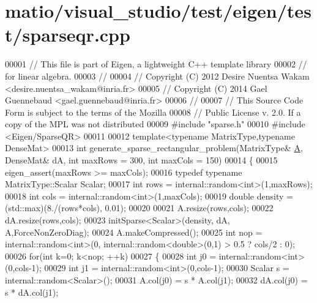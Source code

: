 \hypertarget{matio_2visual__studio_2test_2eigen_2test_2sparseqr_8cpp_source}{}\section{matio/visual\+\_\+studio/test/eigen/test/sparseqr.cpp}
\label{matio_2visual__studio_2test_2eigen_2test_2sparseqr_8cpp_source}

\begin{DoxyCode}
00001 \textcolor{comment}{// This file is part of Eigen, a lightweight C++ template library}
00002 \textcolor{comment}{// for linear algebra.}
00003 \textcolor{comment}{//}
00004 \textcolor{comment}{// Copyright (C) 2012 Desire Nuentsa Wakam <desire.nuentsa\_wakam@inria.fr>}
00005 \textcolor{comment}{// Copyright (C) 2014 Gael Guennebaud <gael.guennebaud@inria.fr>}
00006 \textcolor{comment}{//}
00007 \textcolor{comment}{// This Source Code Form is subject to the terms of the Mozilla}
00008 \textcolor{comment}{// Public License v. 2.0. If a copy of the MPL was not distributed}
00009 \textcolor{preprocessor}{#include "sparse.h"}
00010 \textcolor{preprocessor}{#include <Eigen/SparseQR>}
00011 
00012 \textcolor{keyword}{template}<\textcolor{keyword}{typename} MatrixType,\textcolor{keyword}{typename} DenseMat>
00013 \textcolor{keywordtype}{int} generate\_sparse\_rectangular\_problem(MatrixType& \hyperlink{group___core___module_class_eigen_1_1_matrix}{A}, DenseMat& dA, \textcolor{keywordtype}{int} maxRows = 300, \textcolor{keywordtype}{int} maxCols = 150)
00014 \{
00015   eigen\_assert(maxRows >= maxCols);
00016   \textcolor{keyword}{typedef} \textcolor{keyword}{typename} MatrixType::Scalar Scalar;
00017   \textcolor{keywordtype}{int} rows = internal::random<int>(1,maxRows);
00018   \textcolor{keywordtype}{int} cols = internal::random<int>(1,maxCols);
00019   \textcolor{keywordtype}{double} density = (std::max)(8./(rows*cols), 0.01);
00020   
00021   A.resize(rows,cols);
00022   dA.resize(rows,cols);
00023   initSparse<Scalar>(density, dA, A,ForceNonZeroDiag);
00024   A.makeCompressed();
00025   \textcolor{keywordtype}{int} nop = internal::random<int>(0, internal::random<double>(0,1) > 0.5 ? cols/2 : 0);
00026   \textcolor{keywordflow}{for}(\textcolor{keywordtype}{int} k=0; k<nop; ++k)
00027   \{
00028     \textcolor{keywordtype}{int} j0 = internal::random<int>(0,cols-1);
00029     \textcolor{keywordtype}{int} j1 = internal::random<int>(0,cols-1);
00030     Scalar s = internal::random<Scalar>();
00031     A.col(j0)  = s * A.col(j1);
00032     dA.col(j0) = s * dA.col(j1);

\end{DoxyCode}

